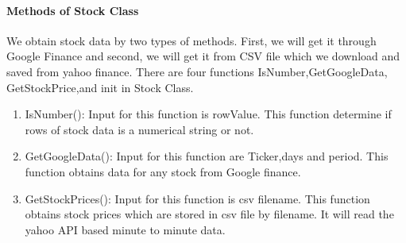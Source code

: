 \paragraph{Methods of Stock Class}
We obtain stock data by two types of methods. First, we will get it through Google Finance and second, we will get it from CSV file which we download and saved from yahoo finance.
There are four functions IsNumber,GetGoogleData, GetStockPrice,and init in Stock Class.
\begin{enumerate}
  \item  IsNumber(): Input for this function is rowValue. This function determine if rows of stock data is a numerical string or not.
  \item  GetGoogleData(): Input for this function are Ticker,days and period. This function obtains data for any stock from Google
  finance.
  \item  GetStockPrices(): Input for this function is csv filename. This function obtains stock prices which are stored
  in csv file by filename. It will read the yahoo API based minute to minute data.

\end{enumerate}
